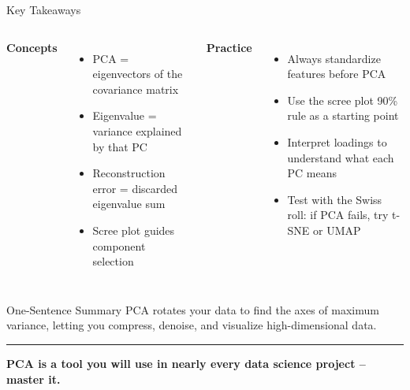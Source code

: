\documentclass[8pt,aspectratio=169]{beamer}
\newcommand{\bottomnote}[1]{%
\vfill
\vspace{-2mm}
\textcolor{mllavender2}{\rule{\textwidth}{0.4pt}}
\vspace{1mm}
\footnotesize
\textbf{#1}
}
\newenvironment{compactlist}{%
  \begin{itemize}%
    \setlength{\itemsep}{2pt}%
    \setlength{\parskip}{0pt}%
    \setlength{\parsep}{0pt}%
}{%
  \end{itemize}%
}
\begin{document}
\begin{frame}[t]{Key Takeaways}
\begin{columns}[T]
\small
\textbf{Concepts}
\begin{compactlist}
\item PCA = eigenvectors of the covariance matrix
\item Eigenvalue = variance explained by that PC
\item Reconstruction error = discarded eigenvalue sum
\item Scree plot guides component selection
\end{compactlist}

\small
\textbf{Practice}
\begin{compactlist}
\item Always standardize features before PCA
\item Use the scree plot 90\% rule as a starting point
\item Interpret loadings to understand what each PC means
\item Test with the Swiss roll: if PCA fails, try t-SNE or UMAP
\end{compactlist}
\end{columns}

\vspace{4mm}
\begin{block}{One-Sentence Summary}
\scriptsize PCA rotates your data to find the axes of maximum variance, letting you compress, denoise, and visualize high-dimensional data.
\end{block}

\bottomnote{PCA is a tool you will use in nearly every data science project -- master it.}
\end{frame}
\end{document}
